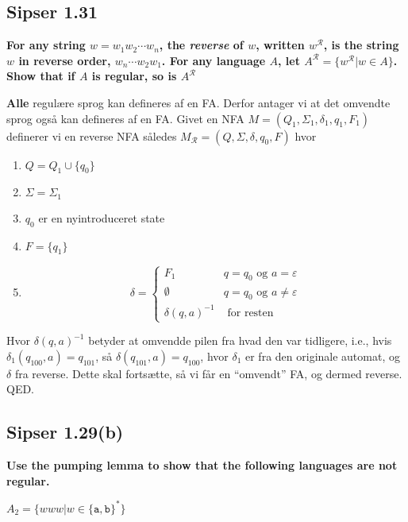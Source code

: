 \subsection*{Sipser 1.31}%
\label{subsec:sipser1.31}

\textbf{For any string $w = w_{1}w_{2} \cdots w_{n}$, the \textit{reverse} of $w$, written $w^{\mathcal{R}}$, is the string $w$ in reverse order, $w_{n} \cdots w_{2}w_{1}$. For any language $A$, let $A^{\mathcal{R}} = \{w^{\mathcal{R}} | w \in A\}$. Show that if $A$ is regular, so is $A^{\mathcal{R}}$}

\textbf{Alle} regulære sprog kan defineres af en FA. Derfor antager vi at det omvendte sprog også kan defineres af en FA. Givet en NFA $M = (Q_{1}, \Sigma_{1}, \delta_{1}, q_{1}, F_{1})$ definerer vi en reverse NFA således $M_{\mathcal{R}} = (Q, \Sigma, \delta, q_{0}, F)$ hvor
\begin{enumerate}
	\item $Q = Q_{1} \cup \{q_{0}\}$
	\item $\Sigma = \Sigma_{1}$
	\item $q_{0}$ er en nyintroduceret state
	\item $F = \{q_{1}\}$
	\item
	      \begin{equation*}
		      \delta =
		      \begin{cases}
			      F_{1}            & q = q_{0} \text{ og } a = \varepsilon    \\
			      \emptyset        & q = q_{0} \text{ og } a \neq \varepsilon \\
			      \delta(q,a)^{-1} & \text{ for resten}
		      \end{cases}
	      \end{equation*}
\end{enumerate}
Hvor $\delta(q,a)^{-1}$ betyder at omvendde pilen fra hvad den var tidligere, i.e., hvis $\delta_{1}(q_{100},a) = q_{101}$, så $\delta(q_{101}, a) = q_{100}$, hvor $\delta_{1}$ er fra den originale automat, og $\delta$ fra reverse. Dette skal fortsætte, så vi får en ``omvendt'' FA, og dermed reverse. QED.

\subsection*{Sipser 1.29(b)}%
\label{subsec:label}

\textbf{Use the pumping lemma to show that the following languages are not regular.}

$A_{2} = \{www|w \in \{\mathtt{a,b}\}^{*}\}$

